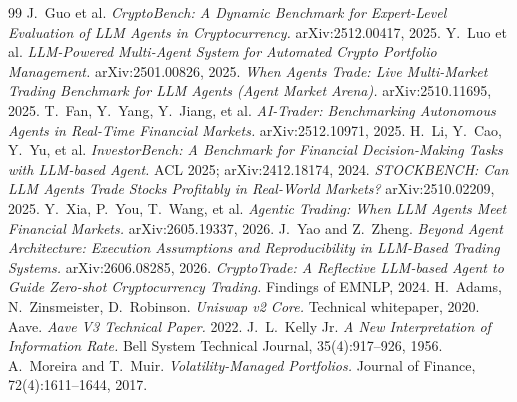 \documentclass[11pt]{article}
\begin{document}
\begin{thebibliography}{99}
 J.\ Guo et al. \emph{CryptoBench: A Dynamic Benchmark for Expert-Level
Evaluation of LLM Agents in Cryptocurrency.} arXiv:2512.00417, 2025.
 Y.\ Luo et al. \emph{LLM-Powered Multi-Agent System for Automated Crypto Portfolio
Management.} arXiv:2501.00826, 2025.
 \emph{When Agents Trade: Live Multi-Market Trading Benchmark for LLM Agents (Agent
Market Arena).} arXiv:2510.11695, 2025.
 T.\ Fan, Y.\ Yang, Y.\ Jiang, et al. \emph{AI-Trader: Benchmarking Autonomous
Agents in Real-Time Financial Markets.} arXiv:2512.10971, 2025.
 H.\ Li, Y.\ Cao, Y.\ Yu, et al. \emph{InvestorBench: A Benchmark for
Financial Decision-Making Tasks with LLM-based Agent.} ACL 2025; arXiv:2412.18174, 2024.
 \emph{STOCKBENCH: Can LLM Agents Trade Stocks Profitably in Real-World Markets?}
arXiv:2510.02209, 2025.
 Y.\ Xia, P.\ You, T.\ Wang, et al. \emph{Agentic Trading: When LLM Agents Meet
Financial Markets.} arXiv:2605.19337, 2026.
 J.\ Yao and Z.\ Zheng. \emph{Beyond Agent Architecture: Execution Assumptions and
Reproducibility in LLM-Based Trading Systems.} arXiv:2606.08285, 2026.
 \emph{CryptoTrade: A Reflective LLM-based Agent to Guide Zero-shot
Cryptocurrency Trading.} Findings of EMNLP, 2024.
 H.\ Adams, N.\ Zinsmeister, D.\ Robinson. \emph{Uniswap v2 Core.} Technical
whitepaper, 2020.
 Aave. \emph{Aave V3 Technical Paper.} 2022.
 J.\ L.\ Kelly Jr. \emph{A New Interpretation of Information Rate.} Bell System
Technical Journal, 35(4):917--926, 1956.
 A.\ Moreira and T.\ Muir. \emph{Volatility-Managed Portfolios.} Journal of Finance,
72(4):1611--1644, 2017.
\end{thebibliography}
\end{document}
